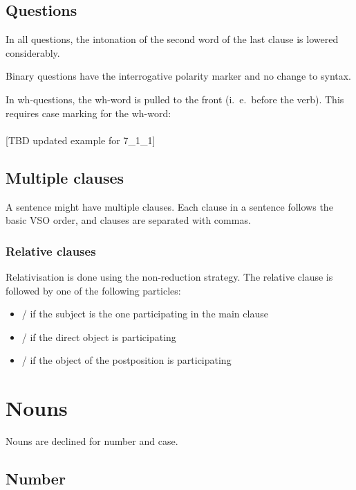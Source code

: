 \documentclass{book}
\newcommand{\northo}[1]{\ortho{\textnedham{#1}}}
\begin{document}
\section{Questions}

In all questions, the intonation of the second word of the last clause is lowered considerably.

Binary questions have the interrogative polarity marker and no change to syntax.

In wh-questions, the wh-word is pulled to the front (i.~e.~before the verb). This requires case marking for the wh-word: \\
~\\
{}[TBD updated example for 7\_1\_1]

\section{Multiple clauses}

A sentence might have multiple clauses. Each clause in a sentence follows the basic VSO order, and clauses are separated with commas.

\subsection{Relative clauses}

Relativisation is done using the non-reduction strategy. The relative clause is followed by one of the following particles:

\begin{itemize}
  \item {} / \northo{ra} if the subject is the one participating in the main clause
  \item {} / \northo{ro} if the direct object is participating
  \item {} / \northo{rkn} if the object of the postposition  is participating
\end{itemize}

\chapter{Nouns}

Nouns are declined for number and case.

\section{Number}
\end{document}

